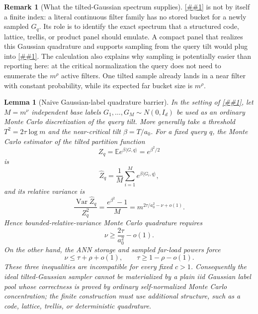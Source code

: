 \documentclass[10pt]{article}
\newcommand{\cref}[1]{\ref{##1}}
\newcommand{\Cref}[1]{\ref{##1}}
\newtheorem{lemma}[theorem]{Lemma}
\theoremstyle{definition}
\newtheorem{remark}[theorem]{Remark}
\newcommand{\E}{\mathbb{E}}
\newcommand{\ip}[2]{\langle #1,#2\rangle}
\begin{document}
\begin{remark}[What the tilted-Gaussian spectrum supplies]
   \label{rem:tilted-gaussian-spectrum}
   \Cref{lem:critical-tilted-gaussian-sampled-spectrum} is not by itself a
   finite index: a literal continuous filter family has no stored bucket for a
   newly sampled \(G_q\).  Its role is to identify the exact spectrum that a
   structured code, lattice, trellis, or product panel should emulate.  A
   compact panel that realizes this Gaussian quadrature and supports sampling
   from the query tilt would plug into
   \cref{cor:gibbs-sampled-rate-bookkeeping}.  The calculation also explains
   why sampling is potentially easier than reporting here: at the critical
   normalization the query does not need to enumerate the
   \(m^\rho\) active filters.  One tilted sample already lands in a near
   filter with constant probability, while its expected far bucket size is
   \(m^\rho\).
\end{remark}

\begin{lemma}[Naive Gaussian-label quadrature barrier]
   \label{lem:naive-gaussian-quadrature-barrier}
   In the setting of
   \cref{lem:critical-tilted-gaussian-sampled-spectrum}, let
   \(M=m^\nu\) independent base labels \(G_1,\ldots,G_M\sim N(0,I_d)\) be used
   as an ordinary Monte Carlo discretization of the query tilt.  More generally
   take a threshold \(T^2=2\tau\log m\) and the near-critical tilt
   \(\beta=T/a_0\).  For a fixed query \(q\), the Monte Carlo estimator of the
   tilted partition function
   \[
      Z_q=\E e^{\beta\ip{G}{q}}=e^{\beta^2/2}
   \]
   is
   \[
      \widehat Z_q=\frac1M\sum_{i=1}^M e^{\beta\ip{G_i}{q}},
   \]
   and its relative variance is
   \[
      \frac{\operatorname{Var}\widehat Z_q}{Z_q^2}
      =
      \frac{e^{\beta^2}-1}{M}
      =
      m^{2\tau/a_0^2-\nu+o(1)}.
      \tag{NQ1}
   \]
   Hence bounded-relative-variance Monte Carlo quadrature requires
   \[
      \nu\ge \frac{2\tau}{a_0^2}-o(1).
      \tag{NQ2}
   \]
   On the other hand, the ANN storage and sampled far-load powers force
   \[
      \nu\le\tau+\rho+o(1),
      \qquad
      \tau\ge1-\rho-o(1).
      \tag{NQ3}
   \]
   These three inequalities are incompatible for every fixed \(c>1\).
   Consequently the ideal tilted-Gaussian sampler cannot be materialized by a
   plain iid Gaussian label pool whose correctness is proved by ordinary
   self-normalized Monte Carlo concentration; the finite construction must use
   additional structure, such as a code, lattice, trellis, or deterministic
   quadrature.
\end{lemma}
\end{document}
